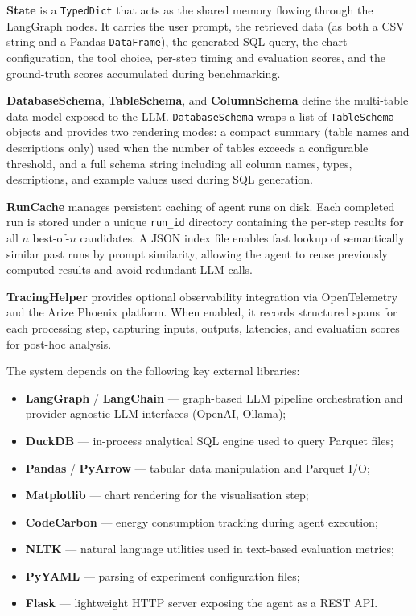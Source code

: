 \documentclass[11pt,a4paper]{article}
\begin{document}
\textbf{State} is a \texttt{TypedDict} that acts as the shared memory flowing through
the LangGraph nodes. It carries the user prompt, the retrieved data (as both a CSV
string and a Pandas \texttt{DataFrame}), the generated SQL query, the chart
configuration, the tool choice, per-step timing and evaluation scores, and the
ground-truth scores accumulated during benchmarking.

\textbf{DatabaseSchema}, \textbf{TableSchema}, and \textbf{ColumnSchema} define the
multi-table data model exposed to the LLM. \texttt{DatabaseSchema} wraps a list of
\texttt{TableSchema} objects and provides two rendering modes: a compact summary
(table names and descriptions only) used when the number of tables exceeds a
configurable threshold, and a full schema string including all column names, types,
descriptions, and example values used during SQL generation.

\textbf{RunCache} manages persistent caching of agent runs on disk. Each completed
run is stored under a unique \texttt{run\_id} directory containing the per-step
results for all $n$ best-of-$n$ candidates. A JSON index file enables fast lookup
of semantically similar past runs by prompt similarity, allowing the agent to reuse
previously computed results and avoid redundant LLM calls.

\textbf{TracingHelper} provides optional observability integration via
OpenTelemetry~\cite{opentelemetry} and the Arize Phoenix platform. When enabled,
it records structured spans for each processing step, capturing inputs, outputs,
latencies, and evaluation scores for post-hoc analysis.

\vspace{0.5em}
\noindent The system depends on the following key external libraries:

\begin{itemize}
    \item \textbf{LangGraph} / \textbf{LangChain} — graph-based LLM pipeline
          orchestration and provider-agnostic LLM interfaces (OpenAI, Ollama);
    \item \textbf{DuckDB} — in-process analytical SQL engine used to query Parquet files;
    \item \textbf{Pandas} / \textbf{PyArrow} — tabular data manipulation and Parquet I/O;
    \item \textbf{Matplotlib} — chart rendering for the visualisation step;
    \item \textbf{CodeCarbon} — energy consumption tracking during agent execution;
    \item \textbf{NLTK} — natural language utilities used in text-based evaluation metrics;
    \item \textbf{PyYAML} — parsing of experiment configuration files;
    \item \textbf{Flask} — lightweight HTTP server exposing the agent as a REST API.
\end{itemize}
\end{document}
